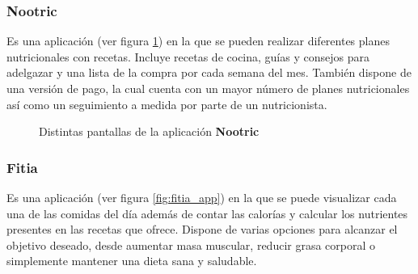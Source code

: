 \subsubsection{Nootric}
Es una aplicación \cite{nootric} (ver figura \ref{fig:nootric_app}) en la que se pueden realizar diferentes planes nutricionales con recetas. Incluye recetas de cocina, guías y consejos para adelgazar y una lista de la compra por cada semana del mes. También dispone de una versión de pago, la cual cuenta con un mayor número de planes nutricionales así como un seguimiento a medida por parte de un nutricionista.
\begin{figure}[H]
    \centering
    \caption{Distintas pantallas de la aplicación \textbf{Nootric}}
    \label{fig:nootric_app}
\end{figure}


\subsubsection{Fitia}
Es una aplicación \cite{fitia} (ver figura \ref{fig:fitia_app}) en la que se puede visualizar cada una de las comidas del día además de contar las calorías y calcular los nutrientes presentes en las recetas que ofrece. Dispone de varias opciones para alcanzar el objetivo deseado, desde aumentar masa muscular, reducir grasa corporal o simplemente mantener una dieta sana y saludable.

